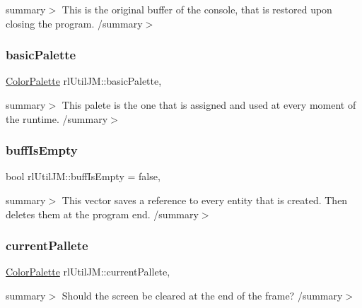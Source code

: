 summary$>$ This is the original buffer of the console, that is restored upon closing the program. /summary$>$ \mbox{\label{classrl_util_j_m_a3055475de8f0221cf48d443371640108}} 
\subsubsection{\texorpdfstring{basic\+Palette}{basicPalette}}
{\footnotesize\ttfamily \hyperlink{class_color_palette}{Color\+Palette} rl\+Util\+J\+M\+::basic\+Palette\hspace{0.3cm}{\ttfamily [static]}, {\ttfamily [private]}}

summary$>$ This palete is the one that is assigned and used at every moment of the runtime. /summary$>$ \mbox{\label{classrl_util_j_m_ae190159bd0ef09b7052d7bb21c5a32fb}} 
\subsubsection{\texorpdfstring{buff\+Is\+Empty}{buffIsEmpty}}
{\footnotesize\ttfamily bool rl\+Util\+J\+M\+::buff\+Is\+Empty = false\hspace{0.3cm}{\ttfamily [static]}, {\ttfamily [private]}}

summary$>$ This vector saves a reference to every entity that is created. Then deletes them at the program end. /summary$>$ \mbox{\label{classrl_util_j_m_a15c920c1aa73d6853a6fd40c53ae0f0a}} 
\subsubsection{\texorpdfstring{current\+Pallete}{currentPallete}}
{\footnotesize\ttfamily \hyperlink{class_color_palette}{Color\+Palette} rl\+Util\+J\+M\+::current\+Pallete\hspace{0.3cm}{\ttfamily [static]}, {\ttfamily [private]}}

summary$>$ Should the screen be cleared at the end of the frame? /summary$>$ \mbox{\label{classrl_util_j_m_a1df970acbe44fac6cb97d745919b23a9}} 
